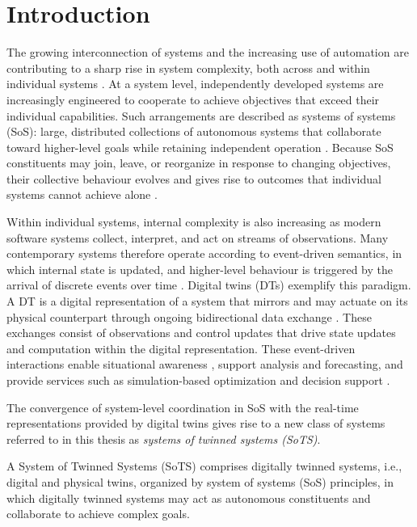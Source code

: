 \chapter{Introduction}\label{ch:introduction}
The growing interconnection of systems and the increasing use of automation are contributing to a sharp rise in system complexity, both across and within individual systems \citep{incose2035}. At a system level, independently developed systems are increasingly engineered to cooperate to achieve objectives that exceed their individual capabilities. Such arrangements are described as systems of systems (SoS): large, distributed collections of autonomous systems that collaborate toward higher-level goals while retaining independent operation \citep{maier1998architecting}. Because SoS constituents may join, leave, or reorganize in response to changing objectives, their collective behaviour evolves and gives rise to outcomes that individual systems cannot achieve alone \citep{nielsen2015systems}.

Within individual systems, internal complexity is also increasing as modern software systems collect, interpret, and act on streams of observations. Many contemporary systems therefore operate according to event-driven semantics, in which internal state is updated, and higher-level behaviour is triggered by the arrival of discrete events over time \citep{cugola2012processing}. Digital twins (DTs) exemplify this paradigm. A DT is a digital representation of a system that mirrors and may actuate on its physical counterpart through ongoing bidirectional data exchange \citep{kritzinger2018digital}. These exchanges consist of observations and control updates that drive state updates and computation within the digital representation. These event-driven interactions enable situational awareness \citep{pires2019digital, zhang2024digital}, support analysis and forecasting, and provide services such as simulation-based optimization and decision support \citep{leng2021digital}.

The convergence of system-level coordination in SoS with the real-time representations provided by digital twins gives rise to a new class of systems referred to in this thesis as \emph{systems of twinned systems (SoTS)}.

\begin{definitionframe}
A System of Twinned Systems (SoTS) comprises digitally twinned systems, i.e., digital and physical twins, organized by system of systems (SoS) principles, in which digitally twinned systems may act as autonomous constituents and collaborate to achieve complex goals.
\end{definitionframe}

